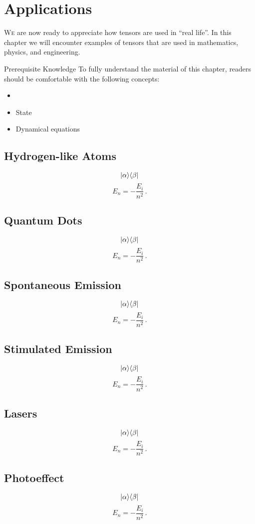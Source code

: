 \chapter{Applications}\label{ch:Applications}
\lettrine[lines=2]{\color{darkocre}W}{e} are now ready to appreciate
how tensors are used in ``real life''. In this chapter we will
encounter examples of
tensors that are used in mathematics, physics, and engineering. 

\begin{myprereq}{Prerequisite Knowledge}
	To fully understand the material of this chapter, readers should be comfortable with the following concepts:
	
	\begin{itemize}
		\item \phantom{phantom}
		\vspace{-0.5cm}
		\item State
		\item Dynamical equations
	\end{itemize}	
\end{myprereq}

\section{Hydrogen-like Atoms}
\[
|{\alpha}\rangle\langle{\beta}|
\]
\[
E_n = -\frac{E_i}{n^2}\,.
\]

\section{Quantum Dots}
\[
|{\alpha}\rangle\langle{\beta}|
\]
\[
E_n = -\frac{E_i}{n^2}\,.
\]

\section{Spontaneous Emission}
\[
|{\alpha}\rangle\langle{\beta}|
\]
\[
E_n = -\frac{E_i}{n^2}\,.
\]

\section{Stimulated Emission}
\[
|{\alpha}\rangle\langle{\beta}|
\]
\[
E_n = -\frac{E_i}{n^2}\,.
\]

\section{Lasers}
\[
|{\alpha}\rangle\langle{\beta}|
\]
\[
E_n = -\frac{E_i}{n^2}\,.
\]

\section{Photoeffect}
\[
|{\alpha}\rangle\langle{\beta}|
\]
\[
E_n = -\frac{E_i}{n^2}\,.
\]

